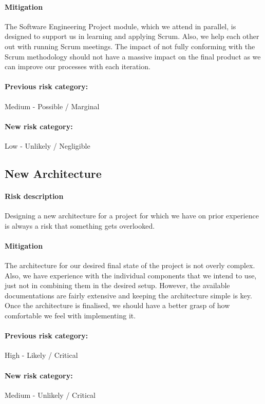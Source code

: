 \paragraph{Mitigation} The Software Engineering Project module, which we attend in parallel, is designed to support us in learning and applying Scrum. Also, we help each other out with running Scrum meetings. The impact of not fully conforming with the Scrum methodology should not have a massive impact on the final product as we can improve our processes with each iteration.
\paragraph{Previous risk category:} Medium - Possible / Marginal
\paragraph{New risk category:} Low - Unlikely / Negligible

\subsection{New Architecture}
\paragraph{Risk description} Designing a new architecture for a project for which we have on prior experience is always a risk that something gets overlooked.
\paragraph{Mitigation} The architecture for our desired final state of the project is not overly complex. Also, we have experience with the individual components that we intend to use, just not in combining them in the desired setup. However, the available documentations are fairly extensive and keeping the architecture simple is key. Once the architecture is finalised, we should have a better grasp of how comfortable we feel with implementing it.
\paragraph{Previous risk category:} High - Likely / Critical
\paragraph{New risk category:} Medium - Unlikely / Critical

